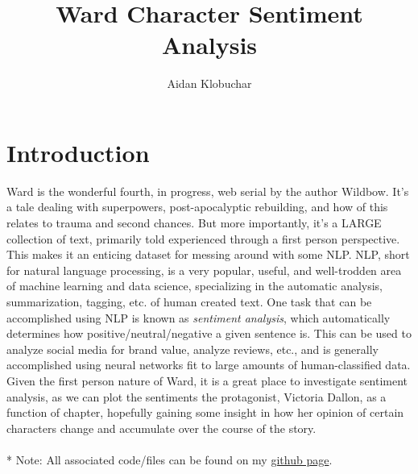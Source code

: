 \documentclass[11pt]{article}
\title{Ward Character Sentiment Analysis}
\author{Aidan Klobuchar}
\begin{document}
\maketitle
\section{Introduction}
\noindent
Ward is the wonderful fourth, in progress, web serial by the author Wildbow. It's a tale dealing with superpowers, post-apocalyptic rebuilding, and how of this relates to trauma and second chances. But more importantly, it's a LARGE collection of text, primarily told experienced through a first person perspective. This makes it an enticing dataset for messing around with some NLP. NLP, short for natural language processing, is a very popular, useful, and well-trodden area of machine learning and data science, specializing in the automatic analysis, summarization, tagging, etc. of human created text. One task that can be accomplished using NLP is known as \emph{sentiment analysis}, which automatically determines how positive/neutral/negative a given sentence is. This can be used to analyze social media for brand value, analyze reviews, etc., and is generally accomplished using neural networks fit to large amounts of human-classified data. Given the first person nature of Ward, it is a great place to investigate sentiment analysis, as we can plot the sentiments the protagonist, Victoria Dallon, as a function of chapter, hopefully gaining some insight in how her opinion of certain characters change and accumulate over the course of the story. 
\\
\\*
Note: All associated code/files can be found on my \href{https://github.com/machinegungeek/Ward-Sentiment-Analysis}{github page}. 
\end{document}
